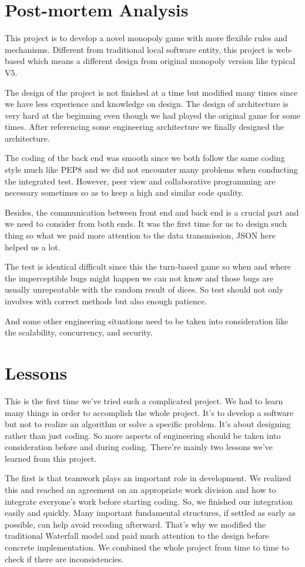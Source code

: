 \documentclass[a4paper,11pt]{article}
\begin{document}
\section{Post-mortem Analysis}
This project is to develop a novel monopoly game with more flexible rules and mechanisms. Different from traditional local software entity, this project is web-based which means a different design from original monopoly version like typical V$5$. 

The design of the project is not finished at a time but modified many times since we have less experience and knowledge on design. The design of architecture is very hard at the beginning even though we had played the original game for some times. After referencing some engineering architecture we finally designed the architecture.

The coding of the back end was smooth since we both follow the same coding style much like PEP$8$ and we did not encounter many problems when conducting the integrated test. However, peer view and collaborative programming are necessary sometimes so as to keep a high and similar code quality.

Besides, the communication between front end and back end is a crucial part and we need to consider from both ends. It was the first time for us to design such thing so what we paid more attention to the data transmission, JSON here helped us a lot.

The test is identical difficult since this the turn-based game so when and where the imperceptible bugs might happen we can not know and those bugs are usually unrepeatable with the random result of dices. So test should not only involves with correct methods but also enough patience.

And some other engineering situations need to be taken into consideration like the scalability, concurrency, and security.
\section{Lessons}
This is the first time we've tried such a complicated project. We had to learn many things in order to accomplish the whole project. It's to develop a software but not to realize an algorithm or solve a specific problem. It's about designing rather than just coding. So more aspects of engineering should be taken into consideration before and during coding. There're mainly two lessons we've learned from this project. 

The first is that teamwork plays an important role in development. We realized this and reached an agreement on an appropriate work division and how to integrate everyone's work before starting coding. So, we finished our integration easily and quickly. Many important fundamental structures, if settled as early as possible, can help avoid recoding afterward. That's why we modified the traditional Waterfall model and paid much attention to the design before concrete implementation. We combined the whole project from time to time to check if there are inconsistencies.
\end{document}
